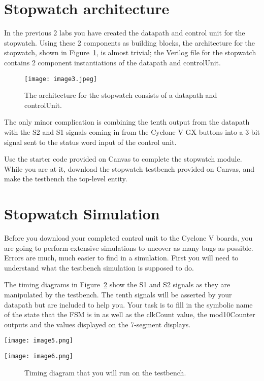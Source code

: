 \section{Stopwatch architecture}

In the previous 2 labs you have created the datapath and control unit
for the stopwatch. Using these 2 components as building blocks, the
architecture for the stopwatch, shown in Figure~\ref{fig:swArch}, is almost trivial;
the Verilog file for the stopwatch contains 2 component instantiations
of the datapath and controlUnit.

\begin{figure}
\texttt{[image: image3.jpeg]}
\caption{The architecture for the stopwatch consists of a datapath and
controlUnit.}
\label{fig:swArch}
\end{figure}

The only minor complication is combining the tenth output from the
datapath with the S2 and S1 signals coming in from the Cyclone V GX
buttons into a 3-bit signal sent to the status word input of the control
unit.

Use the starter code provided on Canvas to complete the stopwatch
module. While you are at it, download the stopwatch testbench provided
on Canvas, and make the testbench the top-level entity.

\section{Stopwatch Simulation}

Before you download your completed control unit to the Cyclone V boards,
you are going to perform extensive simulations to uncover as many bugs
as possible. Errors are much, much easier to find in a simulation. First
you will need to understand what the testbench simulation is supposed to
do.

The timing diagrams in Figure~\ref{fig:swTiming} show the S1 and S2 signals
as they are manipulated by the testbench. The tenth signals will be
asserted by your datapath but are included to help you. Your task is to
fill in the symbolic name of the state that the FSM is in as well as the
clkCount value, the mod10Counter outputs and the values displayed on the
7-segment displays.

\begin{landscape}

\texttt{[image: image5.png]}

\texttt{[image: image6.png]}
\begin{figure}
\caption{Timing diagram that you will run on the testbench.}
\label{fig:swTiming}
\end{figure}
\end{landscape}


